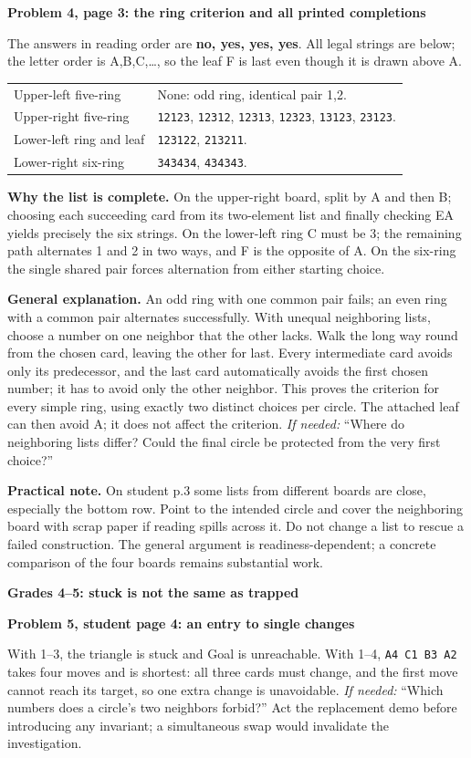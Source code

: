 \documentclass[10pt]{article}
\newcommand{\head}[1]{\par{\large\bfseries #1}\par}
\newcommand{\sub}[1]{\par\textbf{#1}\par}
\newcommand{\hint}[1]{\textit{If needed:} #1}
\newcommand{\word}[1]{\texttt{#1}}
\begin{document}
\sub{Problem 4, page 3: the ring criterion and all printed completions}
The answers in reading order are \textbf{no, yes, yes, yes}. All legal strings are below; the letter order is A,B,C,\ldots, so the leaf F is last even though it is drawn above A.
\begin{center}\renewcommand{\arraystretch}{1.3}
\begin{tabular}{p{.27\linewidth}p{.63\linewidth}}
Upper-left five-ring & None: odd ring, identical pair 1,2.\\
Upper-right five-ring & \word{12123}, \word{12312}, \word{12313}, \word{12323}, \word{13123}, \word{23123}.\\
Lower-left ring and leaf & \word{123122}, \word{213211}.\\
Lower-right six-ring & \word{343434}, \word{434343}.\\
\end{tabular}\end{center}
\textbf{Why the list is complete.} On the upper-right board, split by A and then B; choosing each succeeding card from its two-element list and finally checking EA yields precisely the six strings. On the lower-left ring C must be 3; the remaining path alternates 1 and 2 in two ways, and F is the opposite of A. On the six-ring the single shared pair forces alternation from either starting choice.

\textbf{General explanation.} An odd ring with one common pair fails; an even ring with a common pair alternates successfully. With unequal neighboring lists, choose a number on one neighbor that the other lacks. Walk the long way round from the chosen card, leaving the other for last. Every intermediate card avoids only its predecessor, and the last card automatically avoids the first chosen number; it has to avoid only the other neighbor. This proves the criterion for every simple ring, using exactly two distinct choices per circle. The attached leaf can then avoid A; it does not affect the criterion. \hint{``Where do neighboring lists differ? Could the final circle be protected from the very first choice?''}

\textbf{Practical note.} On student p.3 some lists from different boards are close, especially the bottom row. Point to the intended circle and cover the neighboring board with scrap paper if reading spills across it. Do not change a list to rescue a failed construction. The general argument is readiness-dependent; a concrete comparison of the four boards remains substantial work.
\newpage
\head{Grades 4--5: stuck is not the same as trapped}
\sub{Problem 5, student page 4: an entry to single changes}
With 1--3, the triangle is stuck and Goal is unreachable. With 1--4, \word{A4 C1 B3 A2} takes four moves and is shortest: all three cards must change, and the first move cannot reach its target, so one extra change is unavoidable. \hint{``Which numbers does a circle's two neighbors forbid?''} Act the replacement demo before introducing any invariant; a simultaneous swap would invalidate the investigation.
\end{document}
